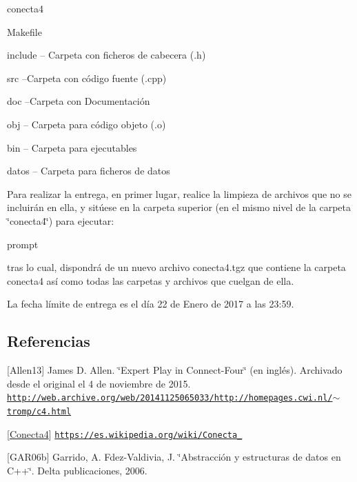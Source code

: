 conecta4
\begin{DoxyItemize}
\item Makefile
\item include -- Carpeta con ficheros de cabecera (.h)
\item src --Carpeta con código fuente (.cpp)
\item doc --Carpeta con Documentación
\item obj -- Carpeta para código objeto (.o)
\item bin -- Carpeta para ejecutables
\item datos -- Carpeta para ficheros de datos
\end{DoxyItemize}

Para realizar la entrega, en primer lugar, realice la limpieza de archivos que no se incluirán en ella, y sitúese en la carpeta superior (en el mismo nivel de la carpeta \char`\"{}conecta4\char`\"{}) para ejecutar\+: 
\begin{DoxyCode}
prompt%
\end{DoxyCode}
 tras lo cual, dispondrá de un nuevo archivo conecta4.\+tgz que contiene la carpeta conecta4 así como todas las carpetas y archivos que cuelgan de ella.

La fecha límite de entrega es el día 22 de Enero de 2017 a las 23\+:59.\hypertarget{index_referencias}{}\subsection{Referencias}\label{index_referencias}
\mbox{[}Allen13\mbox{]} James D. Allen. \char`\"{}\+Expert Play in Connect-\/\+Four\char`\"{} (en inglés). Archivado desde el original el 4 de noviembre de 2015. \href{http://web.archive.org/web/20141125065033/http://homepages.cwi.nl/~tromp/c4.html}{\tt http\+://web.\+archive.\+org/web/20141125065033/http\+://homepages.\+cwi.\+nl/$\sim$tromp/c4.\+html}

\mbox{[}\hyperlink{classConecta4}{Conecta4}\mbox{]} \href{https://es.wikipedia.org/wiki/Conecta_4}{\tt https\+://es.\+wikipedia.\+org/wiki/\+Conecta\+\_}

\mbox{[}G\+A\+R06b\mbox{]} Garrido, A. Fdez-\/\+Valdivia, J. \char`\"{}\+Abstracción y estructuras de datos en C++\char`\"{}. Delta publicaciones, 2006. 